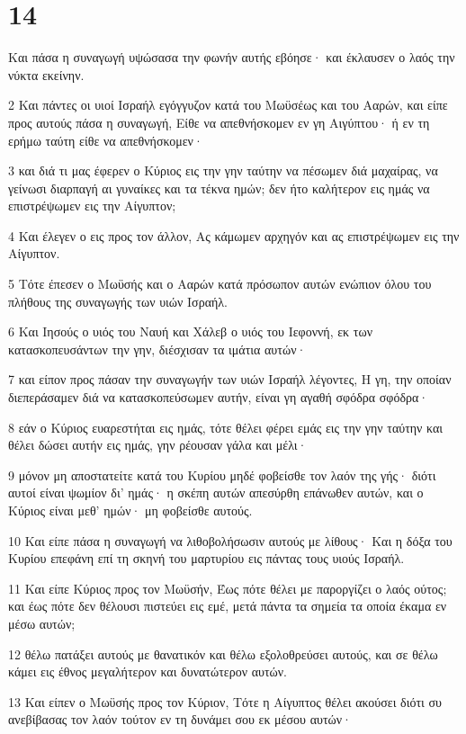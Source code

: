 \chapter{14}

\par Και πάσα η συναγωγή υψώσασα την φωνήν αυτής εβόησε· και έκλαυσεν ο λαός την νύκτα εκείνην.
\par 2 Και πάντες οι υιοί Ισραήλ εγόγγυζον κατά του Μωϋσέως και του Ααρών, και είπε προς αυτούς πάσα η συναγωγή, Είθε να απεθνήσκομεν εν γη Αιγύπτου· ή εν τη ερήμω ταύτη είθε να απεθνήσκομεν·
\par 3 και διά τι μας έφερεν ο Κύριος εις την γην ταύτην να πέσωμεν διά μαχαίρας, να γείνωσι διαρπαγή αι γυναίκες και τα τέκνα ημών; δεν ήτο καλήτερον εις ημάς να επιστρέψωμεν εις την Αίγυπτον;
\par 4 Και έλεγεν ο εις προς τον άλλον, Ας κάμωμεν αρχηγόν και ας επιστρέψωμεν εις την Αίγυπτον.
\par 5 Τότε έπεσεν ο Μωϋσής και ο Ααρών κατά πρόσωπον αυτών ενώπιον όλου του πλήθους της συναγωγής των υιών Ισραήλ.
\par 6 Και Ιησούς ο υιός του Ναυή και Χάλεβ ο υιός του Ιεφοννή, εκ των κατασκοπευσάντων την γην, διέσχισαν τα ιμάτια αυτών·
\par 7 και είπον προς πάσαν την συναγωγήν των υιών Ισραήλ λέγοντες, Η γη, την οποίαν διεπεράσαμεν διά να κατασκοπεύσωμεν αυτήν, είναι γη αγαθή σφόδρα σφόδρα·
\par 8 εάν ο Κύριος ευαρεστήται εις ημάς, τότε θέλει φέρει εμάς εις την γην ταύτην και θέλει δώσει αυτήν εις ημάς, γην ρέουσαν γάλα και μέλι·
\par 9 μόνον μη αποστατείτε κατά του Κυρίου μηδέ φοβείσθε τον λαόν της γής· διότι αυτοί είναι ψωμίον δι' ημάς· η σκέπη αυτών απεσύρθη επάνωθεν αυτών, και ο Κύριος είναι μεθ' ημών· μη φοβείσθε αυτούς.
\par 10 Και είπε πάσα η συναγωγή να λιθοβολήσωσιν αυτούς με λίθους· Και η δόξα του Κυρίου επεφάνη επί τη σκηνή του μαρτυρίου εις πάντας τους υιούς Ισραήλ.
\par 11 Και είπε Κύριος προς τον Μωϋσήν, Έως πότε θέλει με παροργίζει ο λαός ούτος; και έως πότε δεν θέλουσι πιστεύει εις εμέ, μετά πάντα τα σημεία τα οποία έκαμα εν μέσω αυτών;
\par 12 θέλω πατάξει αυτούς με θανατικόν και θέλω εξολοθρεύσει αυτούς, και σε θέλω κάμει εις έθνος μεγαλήτερον και δυνατώτερον αυτών.
\par 13 Και είπεν ο Μωϋσής προς τον Κύριον, Τότε η Αίγυπτος θέλει ακούσει διότι συ ανεβίβασας τον λαόν τούτον εν τη δυνάμει σου εκ μέσου αυτών·
